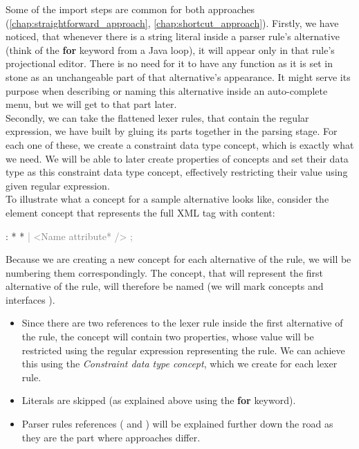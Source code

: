 Some of the import steps are common for both approaches (\ref{chap:straightforward_approach}, \ref{chap:shortcut_approach}).
Firstly, we have noticed, that whenever there is a string literal inside a parser rule's alternative (think of the \textbf{for} keyword from a Java loop), it will appear only in that rule's projectional editor.
There is no need for it to have any function as it is set in stone as an unchangeable part of that alternative's appearance.
It might serve its purpose when describing or naming this alternative inside an auto-complete menu, but we will get to that part later.
\\

Secondly, we can take the flattened lexer rules, that contain the regular expression, we have built by gluing its parts together in the parsing stage. 
For each one of these, we create a constraint data type concept, which is exactly what we need. 
We will be able to later create properties of concepts and set their data type as this constraint data type concept, effectively restricting their value using given regular expression.
\\

To illustrate what a concept for a sample alternative looks like, consider the element concept that represents the full XML tag with content:

\begin{antlr}
	      :   \literal{<}  * \literal{>} * \literal{</}  \literal{>}
             \textcolor{gray}{|   \ap<\ap Name attribute* \ap/>\ap}
             \textcolor{gray}{;}
\end{antlr}

Because we are creating a new concept for each alternative of the rule, we will be numbering them correspondingly.
The concept, that will represent the first alternative of the  rule, will therefore be named 
(we will mark concepts  and interfaces ).

\begin{itemize}
	\item Since there are two references to the  lexer rule inside the first alternative of the  rule, the  concept will contain two properties, whose value will be restricted using the regular expression representing the  rule. 
	We can achieve this using the \textit{Constraint data type concept}, which we create for each lexer rule.

	\item Literals are skipped (as explained above using the \textbf{for} keyword). 

	\item Parser rules references ( and ) will be explained further down the road as they are the part where approaches differ.
\end{itemize}

